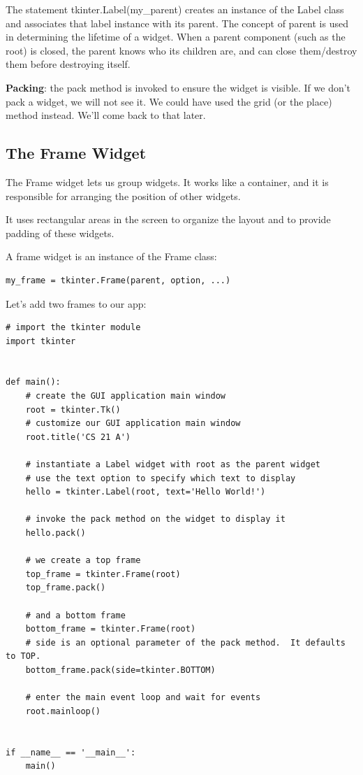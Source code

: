 \documentclass{article}
\begin{document}
The statement tkinter.Label(my{\_}parent) creates an instance of the Label class and associates that label instance with its parent.  The concept of parent is used in determining the lifetime of a widget.  When a parent component (such as the root) is closed, the parent knows who its children are, and can close them/destroy them before destroying itself.

\textbf{Packing}:  the pack method is invoked to ensure the widget is visible. If we don't pack a widget, we will not see it.  We could have used the grid (or the place) method instead.  We’ll come back to that later.

\subsection{The Frame Widget}
The Frame widget lets us group widgets. It works like a container, and it is responsible for arranging the position of other widgets.

It uses rectangular areas in the screen to organize the layout and to provide padding of these widgets. 

A frame widget is an instance of the Frame class:

\begin{lstlisting}
my_frame = tkinter.Frame(parent, option, ...)
\end{lstlisting}

Let's add two frames to our app: 

\begin{lstlisting}
# import the tkinter module
import tkinter


def main():
    # create the GUI application main window
    root = tkinter.Tk()
    # customize our GUI application main window
    root.title('CS 21 A')

    # instantiate a Label widget with root as the parent widget
    # use the text option to specify which text to display
    hello = tkinter.Label(root, text='Hello World!')

    # invoke the pack method on the widget to display it
    hello.pack()

    # we create a top frame
    top_frame = tkinter.Frame(root)
    top_frame.pack()

    # and a bottom frame
    bottom_frame = tkinter.Frame(root)
    # side is an optional parameter of the pack method.  It defaults to TOP.
    bottom_frame.pack(side=tkinter.BOTTOM)

    # enter the main event loop and wait for events
    root.mainloop()


if __name__ == '__main__':
    main()
\end{lstlisting}
\end{document}
